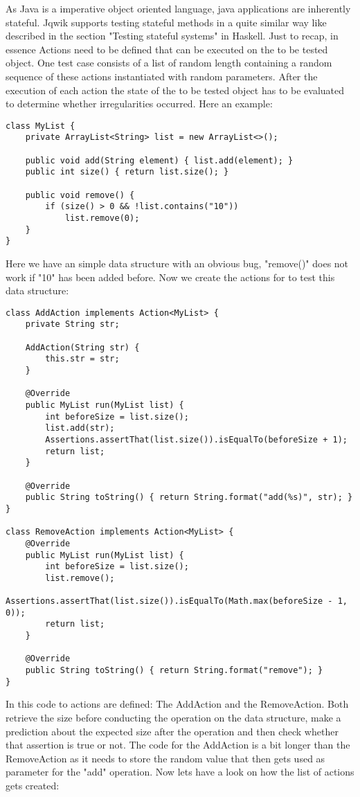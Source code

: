 \documentclass[a4paper, 12pt]{article} %
\begin{document}
As Java is a imperative object oriented language, java applications are inherently stateful. Jqwik supports testing stateful methods in a quite similar way like described in the section "Testing stateful systems" in Haskell. Just to recap, in essence Actions need to be defined that can be executed on the to be tested object. One test case consists of a list of random length containing a random sequence of these actions instantiated with random parameters. After the execution of each action the state of the to be tested object has to be evaluated to determine whether irregularities occurred. Here an example:

\begin{verbatim}
class MyList {
    private ArrayList<String> list = new ArrayList<>();

    public void add(String element) { list.add(element); }
    public int size() { return list.size(); }

    public void remove() {
        if (size() > 0 && !list.contains("10"))
            list.remove(0);
    }
}
\end{verbatim} 

Here we have an simple data structure with an obvious bug, "remove()" does not work if "10" has been added before. Now we create the actions for to test this data structure:

\begin{verbatim}
class AddAction implements Action<MyList> {
    private String str;

    AddAction(String str) {
        this.str = str;
    }

    @Override
    public MyList run(MyList list) {
        int beforeSize = list.size();
        list.add(str);
        Assertions.assertThat(list.size()).isEqualTo(beforeSize + 1);
        return list;
    }

    @Override
    public String toString() { return String.format("add(%s)", str); }
}

class RemoveAction implements Action<MyList> {
    @Override
    public MyList run(MyList list) {
        int beforeSize = list.size();
        list.remove();
        Assertions.assertThat(list.size()).isEqualTo(Math.max(beforeSize - 1, 0));
        return list;
    }

    @Override
    public String toString() { return String.format("remove"); }
}
\end{verbatim} 

In this code to actions are defined: The AddAction and the RemoveAction. Both retrieve the size before conducting the operation on the data structure, make a prediction about the expected size after the operation and then check whether that assertion is true or not. The code for the AddAction is a bit longer than the RemoveAction as it needs to store the random value that then gets used as parameter for the "add" operation. Now lets have a look on how the list of actions gets created:
\end{document}
